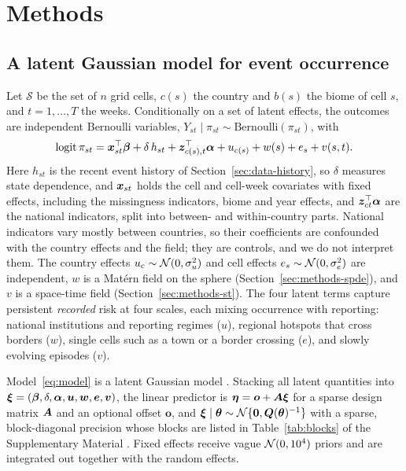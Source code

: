 \section{Methods}\label{sec:methods}

\subsection{A latent Gaussian model for event occurrence}\label{sec:methods-model}

Let $\mathcal{S}$ be the set of $n$ grid cells, $c(s)$ the country and $b(s)$
the biome of cell $s$, and $t = 1, \dots, T$ the weeks. Conditionally on a set
of latent effects, the outcomes are independent Bernoulli variables,
$Y_{st} \mid \pi_{st} \sim \mathrm{Bernoulli}(\pi_{st})$, with
\begin{equation}\label{eq:model}
\operatorname{logit} \pi_{st}
= \bm{x}_{st}^\top \bm{\beta}
+ \delta\, h_{st}
+ \bm{z}_{c(s),t}^\top \bm{\alpha}
+ u_{c(s)} + w(s) + e_s + v(s,t).
\end{equation}
Here $h_{st}$ is the recent event history of Section~\ref{sec:data-history}, so
$\delta$ measures state dependence, and $\bm{x}_{st}$ holds the cell and cell-week
covariates with fixed effects, including the missingness indicators, biome and year
effects, and $\bm{z}_{ct}^\top\bm{\alpha}$ are the national indicators, split into
between- and within-country parts. National indicators vary mostly between countries,
so their coefficients are confounded with the country effects and the field; they are
controls, and we do not interpret them. The country effects
$u_c \sim \mathcal{N}(0, \sigma_u^2)$ and cell effects $e_s \sim \mathcal{N}(0, \sigma_e^2)$
are independent, $w$ is a Mat\'ern field on the sphere
(Section~\ref{sec:methods-spde}), and $v$ is a space-time field
(Section~\ref{sec:methods-st}). The four latent terms capture persistent
\emph{recorded} risk at four scales, each mixing occurrence with reporting:
national institutions and reporting regimes ($u$), regional hotspots that cross
borders ($w$), single cells such as a town or a border crossing ($e$), and slowly
evolving episodes ($v$).

Model~\eqref{eq:model} is a latent Gaussian model \citep{rue2009inla}. Stacking all
latent quantities into
$\bm{\xi} = (\bm{\beta}, \delta, \bm{\alpha}, \bm{u}, \bm{w}, \bm{e}, \bm{v})$, the
linear predictor is $\bm{\eta} = \bm{o} + \bm{A} \bm{\xi}$ for a sparse design
matrix $\bm{A}$ and an optional offset $\bm{o}$, and
$\bm{\xi} \mid \bm{\theta} \sim \mathcal{N}\{\bm{0}, \bm{Q}(\bm{\theta})^{-1}\}$ with a sparse,
block-diagonal precision whose blocks are listed in Table~\ref{tab:blocks} of the Supplementary Material
\citep{rue2005gmrf}. Fixed effects receive vague $\mathcal{N}(0, 10^4)$ priors and are
integrated out together with the random effects.

